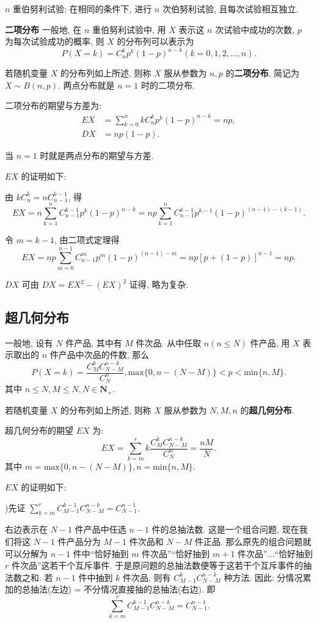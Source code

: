 \documentclass[titlepage]{ctexart}
\begin{document}
$n$ 重伯努利试验: 在相同的条件下, 进行 $n$ 次伯努利试验, 且每次试验相互独立.

\textbf{二项分布} \quad 一般地, 在 $n$ 重伯努利试验中, 用 $X$ 表示这 $n$ 次试验中成功的次数, $p$ 为每次试验成功的概率, 则 $X$ 的分布列可以表示为
\[
P(X = k) = C_{n}^k p^k (1-p)^{n-k}(k = 0,1,2,\dots,n).
\]

若随机变量 $X$ 的分布列如上所述, 则称 $X$ 服从参数为 $n,p$ 的\textbf{二项分布}, 简记为 $X\sim B(n,p)$. 两点分布就是 $n = 1$ 时的二项分布.

二项分布的期望与方差为:
\begin{align*}
    EX &= \sum_{k=0}^{n}kC_{n}^{k}p^k(1-p)^{n-k} = np, \\
    DX &= np(1-p).
\end{align*}

当 $n = 1$ 时就是两点分布的期望与方差.

$EX$ 的证明如下:

由 $kC_{n}^{k} = nC_{n-1}^{k-1}$, 得
\[
EX = n\sum_{k=1}^{n}C_{n-1}^{k-1}p^k(1-p)^{n-k} = np\sum_{k=1}^{n}C_{n-1}^{k-1}p^{k-1}(1-p)^{(n-1)-(k-1)}.
\]

令 $m = k - 1$, 由二项式定理得
\[
EX = np\sum_{m=0}^{n-1}C_{n-1}^{m}p^m(1-p)^{(n-1)-m} = np[p + (1 - p)]^{n-1} = np. 
\]

$DX$ 可由 $DX = EX^2 - (EX)^2$ 证得, 略为复杂.

\subsection{超几何分布}

一般地, 设有 $N$ 件产品, 其中有 $M$ 件次品. 从中任取 $n(n \leqslant N)$ 件产品, 用 $X$ 表示取出的 $n$ 件产品中次品的件数, 那么
\[
P(X = k) = \frac{C_{M}^{k}C_{N-M}^{n-k}}{C_{N}^{n}}, \text{max}\{0, n - (N - M)\} < p < \text{min}\{n, M\}.
\]
其中 $n \leqslant N, M \leqslant N, N \in \mathbf{N}_+$.

若随机变量 $X$ 的分布列如上所述, 则称 $X$ 服从参数为 $N, M, n$ 的\textbf{超几何分布}.

超几何分布的期望 $EX$ 为:
\[
EX = \sum_{k=m}^{r}k\frac{C_{M}^{k}C_{N-M}^{n-k}}{C_N^n} = \frac{nM}{N}.
\]
其中 $m = \text{max}\{0, n - (N - M)\}, n = \text{min}\{n, M\}$. 

$EX$ 的证明如下:

)先证 $\sum\limits_{k=m}^{r}C_{M-1}^{k-1}C_{N-M}^{n-k} = C_{N-1}^{n-1}$.

右边表示在 $N - 1$ 件产品中任选 $n - 1$ 件的总抽法数. 
这是一个组合问题, 现在我们将这 $N - 1$ 件产品分为 $M - 1$ 件次品和 $N - M$ 件正品. 
那么原先的组合问题就可以分解为 $n-1$ 件中``恰好抽到 $m$ 件次品''``恰好抽到 $m + 1$ 件次品''$\dots$``恰好抽到 $r$ 件次品''这若干个互斥事件.
于是原问题的总抽法数便等于这若干个互斥事件的抽法数之和. 若 $n - 1$ 件中抽到 $k$ 件次品, 则有 $C_{M-1}^{k}C_{N-M}^{n-k}$ 种方法.
因此: 分情况累加的总抽法(左边) = 不分情况直接抽的总抽法(右边). 即
\[
\sum\limits_{k=m}^{r}C_{M-1}^{k-1}C_{N-M}^{n-k} = C_{N-1}^{n-1}.
\]
\end{document}
